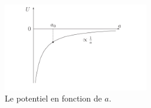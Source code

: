 \documentclass[a4paper,12pt]{report}
\theoremstyle{plain}
\theoremstyle{plain}
\begin{document}
 \begin{figure}[h]
\begin{minipage}{14pc}
\includegraphics[width=15pc]{t9.png}
\caption{Le potentiel en fonction de $a$.}
\end{minipage}\hspace{3pc}%
\end{figure}
\end{document}
